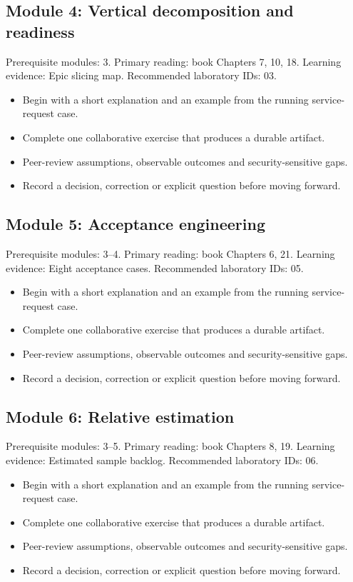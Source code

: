 \documentclass[11pt,letterpaper]{article}
\begin{document}
\subsection{Module 4: Vertical decomposition and readiness}
Prerequisite modules: 3. Primary reading: book Chapters 7, 10, 18. Learning evidence: Epic slicing map. Recommended laboratory IDs: 03.

\begin{itemize}[leftmargin=*,itemsep=2pt]
\item Begin with a short explanation and an example from the running service-request case.
\item Complete one collaborative exercise that produces a durable artifact.
\item Peer-review assumptions, observable outcomes and security-sensitive gaps.
\item Record a decision, correction or explicit question before moving forward.
\end{itemize}
\subsection{Module 5: Acceptance engineering}
Prerequisite modules: 3–4. Primary reading: book Chapters 6, 21. Learning evidence: Eight acceptance cases. Recommended laboratory IDs: 05.

\begin{itemize}[leftmargin=*,itemsep=2pt]
\item Begin with a short explanation and an example from the running service-request case.
\item Complete one collaborative exercise that produces a durable artifact.
\item Peer-review assumptions, observable outcomes and security-sensitive gaps.
\item Record a decision, correction or explicit question before moving forward.
\end{itemize}
\subsection{Module 6: Relative estimation}
Prerequisite modules: 3–5. Primary reading: book Chapters 8, 19. Learning evidence: Estimated sample backlog. Recommended laboratory IDs: 06.

\begin{itemize}[leftmargin=*,itemsep=2pt]
\item Begin with a short explanation and an example from the running service-request case.
\item Complete one collaborative exercise that produces a durable artifact.
\item Peer-review assumptions, observable outcomes and security-sensitive gaps.
\item Record a decision, correction or explicit question before moving forward.
\end{itemize}
\end{document}
